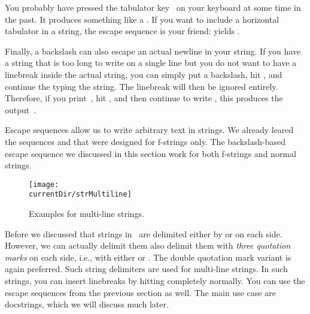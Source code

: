 You probably have pressed the tabulator key~\keys{\tab} on your keyboard at some time in the past.
It produces something like a .
If you want to include a horizontal tabulator in a string, the escape sequence  is your friend:
 yields .

Finally, a backslash can also escape an actual newline in your string.
If you have a string that is too long to write on a single line but you do not want to have a linebreak inside the actual string, you can simply put a backslash, hit \keys{\enter}, and continue the typing the string.
The linebreak will then be ignored entirely.
Therefore, if you print~, hit \keys{\enter}, and then continue to write , this produces the output~.

Escape sequences allow us to write arbitrary text in strings.
We already leared the sequences \inQuotes{\textbraceleft\textbraceleft}\pythonIdx{\textbraceleft\textbraceleft} and \inQuotes{\textbraceright\textbraceright}\pythonIdx{\textbraceright\textbraceright} that were designed for f-strings only.
The backslash-based escape sequence we discussed in this section work for both f-strings and normal strings.%
\endhsection%
%
%
%
\begin{figure}%
\centering%
\texttt{[image: \\currentDir/strMultiline]}%
\caption{Examples for multi-line strings.}%
\label{fig:strMultiline}%
\end{figure}%
%
Before we discussed that strings in \python\ are delimited either by \pythonIdx{\textquotedbl} or \pythonIdx{\textquotesingle} on each side.
However, we can actually delimit them also delimit them with \emph{three quotation marks} on each side, i.e., with either \pythonIdx{\textquotedbl\textquotedbl\textquotedbl} or \pythonIdx{\textquotesingle\textquotesingle\textquotesingle}.
The double quotation mark variant is again preferred.
Such string delimiters are used for multi-line strings.
In such strings, you can insert linebreaks by hitting \keys{\enter} completely normally.
You can use the escape sequences from the previous section as well.
The main use case are docstrings, which we will discuss much later.

